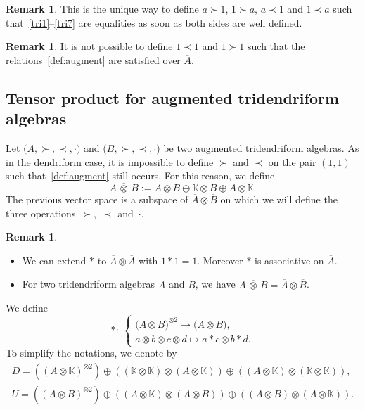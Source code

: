 \documentclass[pdftex]{sigma}
\numberwithin{equation}{section}
\theoremstyle{definition}
\newtheorem{Rq}[defi]{Remark}
\theoremstyle{plain}
\newcommand{\K}{\mathbb{K}}
\begin{document}
\begin{Rq}
	This is the unique way to define $a\succ 1$, $1\succ a$, $a\prec 1$ and $1\prec a$ such that~\eqref{tri1}--\eqref{tri7} are equalities as soon as both sides are well defined.
\end{Rq}
\begin{Rq}
	It is not possible to define $1\prec 1$ and $1\succ 1$ such that the relations~\eqref{def:augment} are satisfied over $\overline{A}.$
\end{Rq}

\subsection{Tensor product for augmented tridendriform algebras}

Let $\big(\overline{A},\succ,\prec,\cdot\big)$ and $\big(\overline{B},\succ,\prec,\cdot\big)$ be two augmented tridendriform algebras. As in the dendriform case, it is impossible to define $\succ$ and $\prec$ on the pair $(1,1)$ such that~\eqref{def:augment} still occurs. For this reason, we define
\[
A\,\overline{\otimes}\, B:=A\otimes B\oplus \K\otimes B \oplus A\otimes \K.
\]
The previous vector space is a subspace of $\overline{A}\otimes \overline{B}$ on which we will define the three opera\-tions~$\succ$,~$\prec$ and~$\cdot$.
\begin{Rq}\qquad
	\begin{itemize}\itemsep=0pt
		\item We can extend $*$ to $\overline{A}\otimes \overline{A}$ with $1*1=1$. Moreover $*$ is associative on $\overline{A}$.
		\item For two tridendriform algebras $A$ and $B$, we have $\overline{A\,\overline{\otimes}\, B}=\overline{A}\otimes \overline{B}$.
	\end{itemize}
\end{Rq}
We define
\begin{equation*}
	*\colon \ \begin{cases}
	\big(\overline{A}\otimes \overline{B}\big)^{\otimes 2} \rightarrow \big(\overline{A}\otimes \overline{B}\big), \\
	a\otimes b\otimes c\otimes d \mapsto a*c\otimes b*d.
	\end{cases}
\end{equation*}
To simplify the notations, we denote by
\begin{gather*}
	D=\left((A\otimes \K)^{\otimes 2}\right)\oplus\left((\K \otimes \K)\otimes (A\otimes \K)\right)\oplus \left((A\otimes \K)\otimes (\K\otimes \K)\right), \\
	 U= \left((A\otimes B)^{\otimes 2}\right)\oplus \left((A\otimes \K)\otimes (A\otimes B)\right)\oplus \left((A\otimes B)\otimes (A\otimes \K)\right).
\end{gather*}
\end{document}
